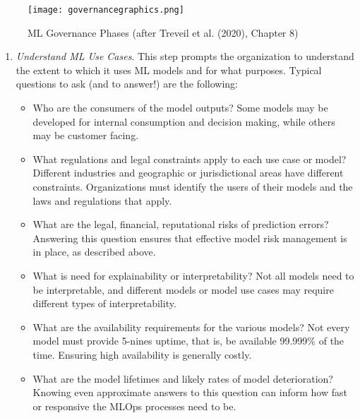 \begin{figure}
\centering
\texttt{[image: governancegraphics.png]}
\caption[ML Governance Phases]{ML Governance Phases (after Treveil et al. (2020), Chapter 8)}
\label{fig:mlgovernance}
\end{figure}

\begin{enumerate}
\item \emph{Understand ML Use Cases}. This step prompts the organization to understand the extent to which it uses ML models and for what purposes. Typical questions to ask (and to answer!) are the following:
\begin{itemize}
  \item Who are the consumers of the model outputs? Some models may be developed for internal consumption and decision making, while others may be customer facing.
  \item What regulations and legal constraints apply to each use case or model? Different industries and geographic or jurisdictional areas have different constraints. Organizations must identify the users of their models and the laws and regulations that apply. 
  \item What are the legal, financial, reputational risks of prediction errors? Answering this question ensures that effective model risk management is in place, as described above. 
  \item What is need for explainability or interpretability? Not all models need to be interpretable, and different models or model use cases may require different types of interpretability.
  \item What are the availability requirements for the various models? Not every model must provide 5-nines uptime, that is, be available 99.999\% of the time. Ensuring high availability is generally costly. 
  \item What are the model lifetimes and likely rates of model deterioration? Knowing even approximate answers to this question can inform how fast or responsive the MLOps processes need to be. 
\end{itemize}


\end{enumerate}
